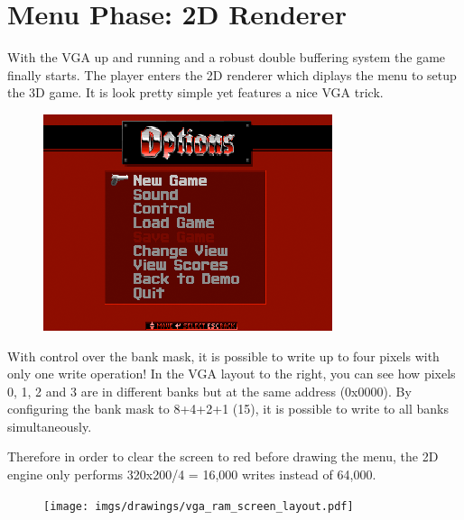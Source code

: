 \section{Menu Phase: 2D Renderer}
With the VGA up and running and a robust double buffering system the game finally starts. The player enters the 2D renderer which diplays the menu to setup the 3D game. It is look pretty simple yet features a nice VGA trick.
\par
\begin{figure}[H]
\centering
\includegraphics[width=\textwidth]{screenshots/first_menu.png}
\end{figure}
\par


\begin{minipage}{.55\textwidth}
With control over the bank mask, it is possible to write up to four pixels with only one write operation! In the VGA layout to the right, you can see how pixels 0, 1, 2 and 3 are in different banks but at the same address (0x0000). By configuring the bank mask to 8+4+2+1 (15), it is possible to write to all banks simultaneously.\\
\par
Therefore in order to clear the screen to red before drawing the menu, the 2D engine only performs 320x200/4 = 16,000 writes instead of 64,000.\\
\par
\end{minipage}
\begin{minipage}{.4\textwidth}
\begin{figure}[H]
\centering
\texttt{[image: imgs/drawings/vga\_ram\_screen\_layout.pdf]}
\end{figure}
\end{minipage}

